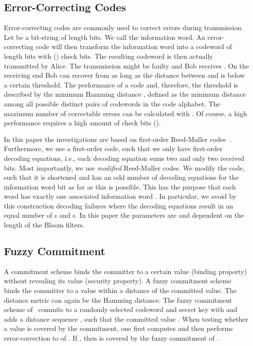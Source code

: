 \documentclass{llncs}
\begin{document}
\subsection{Error-Correcting Codes}
\label{sec:ecc}

Error-correcting codes are commonly used to correct errors during transmission.
Let  be a bit-string of length  bits.
We call  the information word. An error-correcting code will then transform the information word into a codeword of length  bits with () check bits.
The resulting codeword  is then actually transmitted by Alice.
The transmission might be faulty and Bob receives .
On the receiving end Bob can recover  from  as long as the distance between  and  is below a certain threshold.
The performance of a code and, therefore, the threshold  is described by the minimum Hamming distance , defined as the minimum distance among all possible distinct pairs of  codewords in the code alphabet.
The maximum number of correctable errors can be calculated with .
Of course, a high performance  requires a high amount of check bits ().

In this paper the investigations are based on  first-order Reed-Muller codes~\cite{Mul54,Ree54}.
Furthermore, we use a first-order code, such that we only have first-order decoding equations, i.e., each decoding equation sums two and only two received bits.
Most importantly, we use {\em modified} Reed-Muller codes.
We modify the code, such that it is shortened and has an odd number of decoding equations for the information word bit as far as this is possible.
This has the purpose that each word  has exactly one associated information word .
In particular, we avoid by this construction decoding failures where the decoding equations result in an equal number of s and s.
In this paper the parameters are  and  dependent on the length of the Bloom filters.

\subsection{Fuzzy Commitment}
\label{sec:fc}

A commitment scheme binds the committer to a certain value (binding property) without revealing its value (security property).
A fuzzy commitment scheme binds the committer to a value within a distance of the committed value.
The distance metric can again be the Hamming distance.
The fuzzy commitment scheme of~\cite{JueWat99} commits to a randomly selected codeword  and secret key  with  and adds a distance sequence , such that the committed value .
When testing whether a value  is covered by the commitment, one first computes  and then performs error-correction to  of .
If , then  is covered by the fuzzy commitment of .
\end{document}
